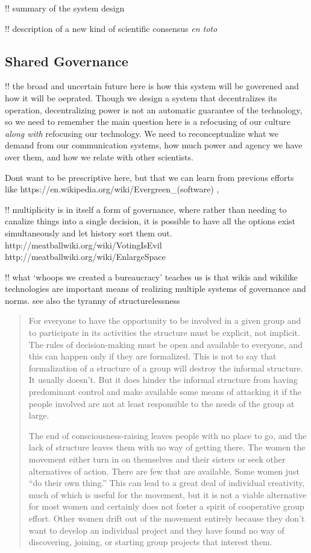 \documentclass[10pt]{tufte-book}
\begin{document}
 !! summary of the system design

!! description of a new kind of scientific consensus \emph{en toto}


\subsection{Shared Governance}

!! the broad and uncertain future here is how this system will be
goverened and how it will be oeprated. Though we design a system that
decentralizes its operation, decentralizing power is not an automatic
guarantee of the technology, so we need to remember the main question
here is a refocusing of our culture \emph{along with} refocusing our
technology. We need to reconceptualize what we demand from our
communication systems, how much power and agency we have over them, and
how we relate with other scientists.

Dont want to be prescriptive here, but that we can learn from previous
efforts like https://en.wikipedia.org/wiki/Evergreen\_(software) ,

!! multiplicity is in itself a form of governance, where rather than
needing to canalize things into a single decision, it is possible to
have all the options exist simultaneously and let history sort them out.
http://meatballwiki.org/wiki/VotingIsEvil
http://meatballwiki.org/wiki/EnlargeSpace

!! what `whoops we created a bureaucracy' teaches us is that wikis and
wikilike technologies are important means of realizing multiple systems
of governance and norms. see also the tyranny of structurelessness

\begin{quote}
For everyone to have the opportunity to be involved in a given group and
to participate in its activities the structure must be explicit, not
implicit. The rules of decision-making must be open and available to
everyone, and this can happen only if they are formalized. This is not
to say that formalization of a structure of a group will destroy the
informal structure. It usually doesn't. But it does hinder the informal
structure from having predominant control and make available some means
of attacking it if the people involved are not at least responsible to
the needs of the group at large.

The end of consciousness-raising leaves people with no place to go, and
the lack of structure leaves them with no way of getting there. The
women the movement either turn in on themselves and their sisters or
seek other alternatives of action. There are few that are available.
Some women just ``do their own thing.'' This can lead to a great deal of
individual creativity, much of which is useful for the movement, but it
is not a viable alternative for most women and certainly does not foster
a spirit of cooperative group effort. Other women drift out of the
movement entirely because they don't want to develop an individual
project and they have found no way of discovering, joining, or starting
group projects that interest them. \citep{freemanTyrannyStucturelessness1970} 
\end{quote}
\end{document}
